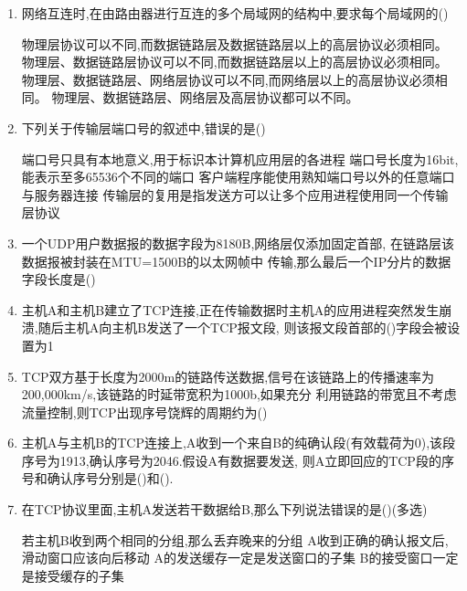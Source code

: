 \documentclass[12pt, a4paper, oneside, UTF8]{ctexbook}
\begin{document}
\begin{enumerate}
    \item 网络互连时,在由路由器进行互连的多个局域网的结构中,要求每个局域网的(\qquad)
    \begin{choices}[1]
    \task 物理层协议可以不同,而数据链路层及数据链路层以上的高层协议必须相同。
    \task 物理层、数据链路层协议可以不同,而数据链路层以上的高层协议必须相同。
    \task 物理层、数据链路层、网络层协议可以不同,而网络层以上的高层协议必须相同。
    \task 物理层、数据链路层、网络层及高层协议都可以不同。
    \end{choices}

    \item 下列关于传输层端口号的叙述中,错误的是(\qquad)
    \begin{choices}[1]
        \task 端口号只具有本地意义,用于标识本计算机应用层的各进程
        \task 端口号长度为16bit, 能表示至多65536个不同的端口
        \task 客户端程序能使用熟知端口号以外的任意端口与服务器连接
        \task 传输层的复用是指发送方可以让多个应用进程使用同一个传输层协议
    \end{choices}

    \item 一个UDP用户数据报的数据字段为8180B,网络层仅添加固定首部, 在链路层该数据报被封装在MTU=1500B的以太网帧中
    传输,那么最后一个IP分片的数据字段长度是(\qquad)

    \item 主机A和主机B建立了TCP连接,正在传输数据时主机A的应用进程突然发生崩溃,随后主机A向主机B发送了一个TCP报文段,
    则该报文段首部的(\qquad)字段会被设置为1

    \item TCP双方基于长度为2000m的链路传送数据,信号在该链路上的传播速率为200,000km/s,该链路的时延带宽积为1000b,如果充分
    利用链路的带宽且不考虑流量控制,则TCP出现序号饶辉的周期约为(\qquad)

    \item 主机A与主机B的TCP连接上,A收到一个来自B的纯确认段(有效载荷为0),该段序号为1913,确认序号为2046.假设A有数据要发送,
    则A立即回应的TCP段的序号和确认序号分别是(\qquad)和(\qquad).

    \item 在TCP协议里面,主机A发送若干数据给B,那么下列说法错误的是(\qquad)(多选)
    \begin{choices}[1]
        \task 若主机B收到两个相同的分组,那么丢弃晚来的分组
        \task A收到正确的确认报文后,滑动窗口应该向后移动
        \task A的发送缓存一定是发送窗口的子集
        \task B的接受窗口一定是接受缓存的子集
    \end{choices}


\end{enumerate}
\end{document}
